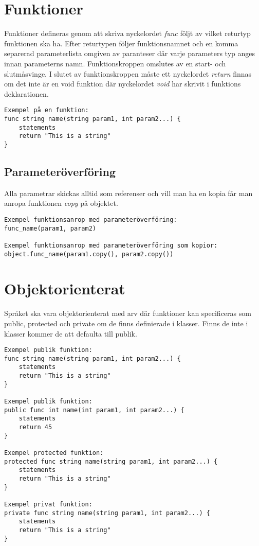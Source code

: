 \documentclass{TDP003mall}
\begin{document}
    \section{Funktioner}
    Funktioner defineras genom att skriva nyckelordet \emph{func} följt av vilket returtyp funktionen ska ha. Efter returtypen följer funktionsnamnet och en komma separerad parameterlista omgiven av paranteser där varje parameters typ anges innan parameterns namn. Funktionskroppen omslutes av en start- och slutmåsvinge. I slutet av funktionskroppen måste ett nyckelordet \emph{return} finnas om det inte är en void funktion där nyckelordet \emph{void} har skrivit i funktions deklarationen.

\begin{verbatim}
Exempel på en funktion:
func string name(string param1, int param2...) {
    statements
    return "This is a string"
}  
\end{verbatim}
    
    \subsection{Parameteröverföring}
    Alla parametrar skickas alltid som referenser och vill man ha en kopia får man anropa funktionen \emph{copy} på objektet.

\begin{verbatim}
Exempel funktionsanrop med parameteröverföring:
func_name(param1, param2)

Exempel funktionsanrop med parameteröverföring som kopior:
object.func_name(param1.copy(), param2.copy())
\end{verbatim}

    \section{Objektorienterat}
    Språket ska vara objektorienterat med arv där funktioner kan specificeras som public, protected och private om de finns definierade i klasser. Finns de inte i klasser kommer de att defaulta till publik.

\begin{verbatim}
Exempel publik funktion:
func string name(string param1, int param2...) {
    statements
    return "This is a string"
} 

Exempel publik funktion: 
public func int name(int param1, int param2...) { 
    statements
    return 45 
} 

Exempel protected funktion: 
protected func string name(string param1, int param2...) { 
    statements
    return "This is a string"
} 

Exempel privat funktion: 
private func string name(string param1, int param2...) { 
    statements
    return "This is a string"
} 
\end{verbatim}
\end{document}
